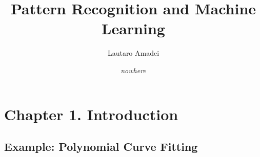 \documentclass[11pt]{article}
\begin{document}
\title{\Large{\textbf{\sffamily Pattern Recognition and Machine Learning }}}
\author{\sffamily Lautaro Amadei}
\date{\small{\textit{
nowhere}}}

\maketitle

\tableofcontents
\section{Chapter 1. Introduction}

\subsection{Example: Polynomial Curve Fitting}
\end{document}
